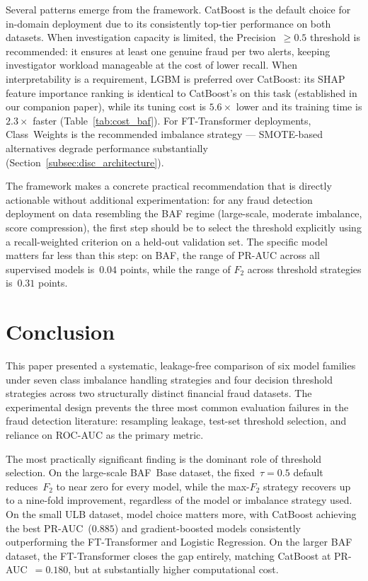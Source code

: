 \documentclass[a4paper,fleqn]{cas-sc}
\begin{document}
Several patterns emerge from the framework.
CatBoost is the default choice for in-domain deployment due to its consistently top-tier
performance on both datasets.
When investigation capacity is limited, the Precision~$\geq\!0.5$ threshold is recommended:
it ensures at least one genuine fraud per two alerts, keeping investigator workload manageable
at the cost of lower recall.
When interpretability is a requirement, LGBM is preferred over CatBoost: its SHAP feature
importance ranking is identical to CatBoost's on this task (established in our companion paper),
while its tuning cost is $5.6\times$ lower and its training time is $2.3\times$ faster
(Table~\ref{tab:cost_baf}).
For FT-Transformer deployments, Class~Weights is the recommended imbalance strategy ---
SMOTE-based alternatives degrade performance substantially (Section~\ref{subsec:disc_architecture}).

The framework makes a concrete practical recommendation that is directly actionable
without additional experimentation: for any fraud detection deployment on data resembling
the BAF regime (large-scale, moderate imbalance, score compression), the first step
should be to select the threshold explicitly using a recall-weighted criterion on a
held-out validation set.
The specific model matters far less than this step: on BAF, the range of PR-AUC
across all supervised models is~$0.04$ points, while the range of $F_2$ across threshold
strategies is~$0.31$ points.

\section{Conclusion}
\label{sec:conclusion}

This paper presented a systematic, leakage-free comparison of six model families under
seven class imbalance handling strategies and four decision threshold strategies across
two structurally distinct financial fraud datasets.
The experimental design prevents the three most common evaluation failures in the fraud
detection literature: resampling leakage, test-set threshold selection, and reliance on
ROC-AUC as the primary metric.

The most practically significant finding is the dominant role of threshold selection.
On the large-scale BAF~Base dataset, the fixed~$\tau=0.5$ default reduces~$F_2$ to
near zero for every model, while the max-$F_2$ strategy recovers up to a nine-fold
improvement, regardless of the model or imbalance strategy used.
On the small ULB dataset, model choice matters more, with CatBoost achieving the best
PR-AUC~($0.885$) and gradient-boosted models consistently outperforming the FT-Transformer
and Logistic Regression.
On the larger BAF dataset, the FT-Transformer closes the gap entirely, matching CatBoost
at PR-AUC~$=0.180$, but at substantially higher computational cost.
\end{document}
